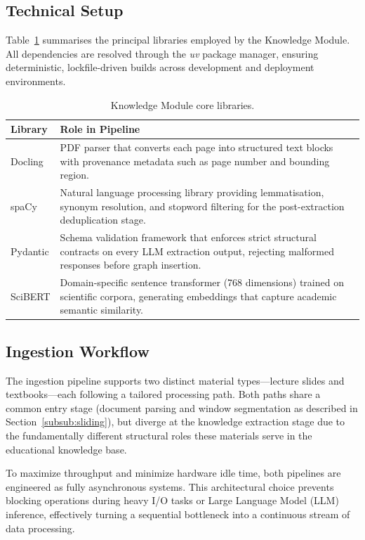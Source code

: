 \subsection{Technical Setup}

Table~\ref{tab:km_libs} summarises the principal libraries employed by the Knowledge Module. All dependencies are resolved through the \textit{uv} package manager, ensuring deterministic, lockfile-driven builds across development and deployment environments.

\begin{table}[H]
\centering
\caption{Knowledge Module core libraries.}
\label{tab:km_libs}
\renewcommand{\arraystretch}{1.3}
\begin{tabularx}{\textwidth}{|l|X|}
\hline
\textbf{Library} & \textbf{Role in Pipeline} \\ \hline
Docling & PDF parser that converts each page into structured text blocks with provenance metadata such as page number and bounding region. \\ \hline
spaCy & Natural language processing library providing lemmatisation, synonym resolution, and stopword filtering for the post-extraction deduplication stage. \\ \hline
Pydantic & Schema validation framework that enforces strict structural contracts on every LLM extraction output, rejecting malformed responses before graph insertion. \\ \hline
SciBERT & Domain-specific sentence transformer (768 dimensions) trained on scientific corpora, generating embeddings that capture academic semantic similarity. \\ \hline
\end{tabularx}
\end{table}

\subsection{Ingestion Workflow}

The ingestion pipeline supports two distinct material types---lecture slides and textbooks---each following a tailored processing path. Both paths share a common entry stage (document parsing and window segmentation as described in Section~\ref{subsub:sliding}), but diverge at the knowledge extraction stage due to the fundamentally different structural roles these materials serve in the educational knowledge base.

To maximize throughput and minimize hardware idle time, both pipelines are engineered as fully asynchronous systems. This architectural choice prevents blocking operations during heavy I/O tasks or Large Language Model (LLM) inference, effectively turning a sequential bottleneck into a continuous stream of data processing.

